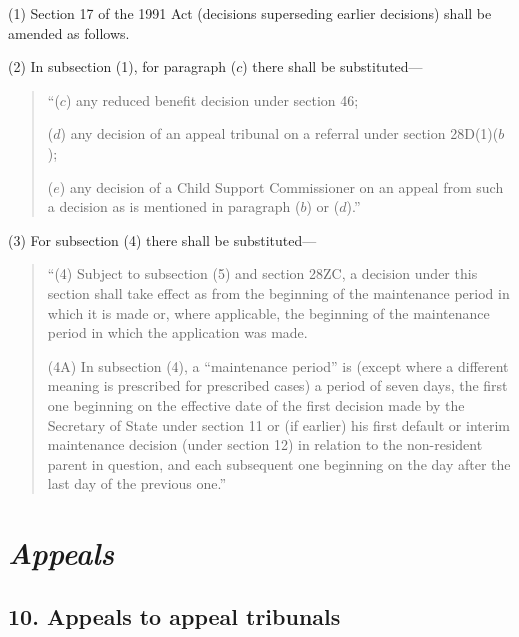 \documentclass[12pt,a4paper]{article}
\begin{document}
(1) Section 17 of the 1991 Act (decisions superseding earlier decisions) shall be amended as follows.

(2) In subsection (1), for paragraph ($c$)  there shall be substituted—
\begin{quotation}
“($c$) any reduced benefit decision under section 46;

($d$) any decision of an appeal tribunal on a referral under section 28D(1)($b$);

($e$) any decision of a Child Support Commissioner on an appeal from such a decision as is mentioned in paragraph ($b$)  or ($d$).”
\end{quotation}

(3) For subsection (4)  there shall be substituted—
\begin{quotation}
“(4) Subject to subsection (5)  and section 28ZC, a decision under this section shall take effect as from the beginning of the maintenance period in which it is made or, where applicable, the beginning of the maintenance period in which the application was made.

(4A) In subsection (4), a “maintenance period” is (except where a different meaning is prescribed for prescribed cases) a period of seven days, the first one beginning on the effective date of the first decision made by the Secretary of State under section 11 or (if earlier) his first default or interim maintenance decision (under section 12) in relation to the non-resident parent in question, and each subsequent one beginning on the day after the last day of the previous one.”
\end{quotation}


\section{\itshape Appeals}

\subsection{10. Appeals to appeal tribunals}
\end{document}

